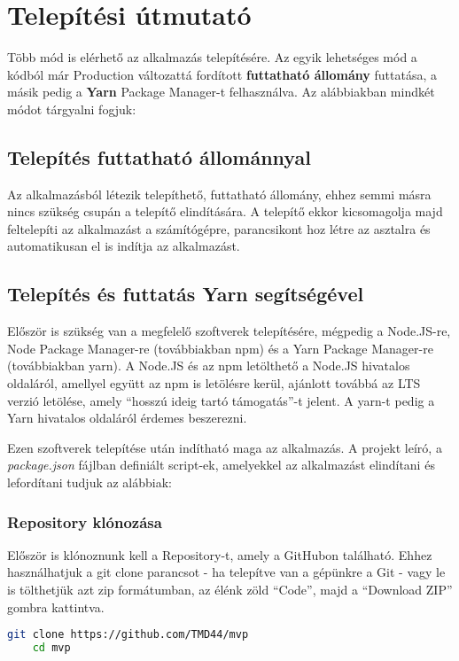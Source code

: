 \section{Telepítési útmutató}
Több mód is elérhető az alkalmazás telepítésére. Az egyik lehetséges mód a kódból már Production változattá fordított {\textbf {futtatható állomány}} futtatása, a másik pedig a {\textbf {Yarn}} Package Manager-t felhasználva. Az alábbiakban mindkét módot tárgyalni fogjuk:

\subsection{Telepítés futtatható állománnyal}
Az alkalmazásból létezik telepíthető, futtatható állomány, ehhez semmi másra nincs szükség csupán a telepítő elindítására. A telepítő ekkor kicsomagolja majd feltelepíti az alkalmazást a számítógépre, parancsikont hoz létre az asztalra és automatikusan el is indítja az alkalmazást.

\subsection{Telepítés és futtatás Yarn segítségével}
Először is szükség van a megfelelő szoftverek telepítésére, mégpedig a Node.JS-re, Node Package Manager-re (továbbiakban npm) és a Yarn Package Manager-re (továbbiakban yarn). A Node.JS és az npm letölthető a Node.JS hivatalos oldaláról\cite{node}, amellyel együtt az npm is letölésre kerül, ajánlott továbbá az LTS verzió letölése, amely ``hosszú ideig tartó támogatás''-t jelent. A yarn-t pedig a Yarn hivatalos oldaláról\cite{yarn} érdemes beszerezni.

Ezen szoftverek telepítése után indítható maga az alkalmazás. A projekt leíró, a {\it package.json} fájlban definiált script-ek, amelyekkel az alkalmazást elindítani és lefordítani tudjuk az alábbiak:

\subsubsection{Repository klónozása}
Először is klónoznunk kell a Repository-t, amely a GitHubon található. Ehhez használhatjuk a git clone parancsot - ha telepítve van a gépünkre a Git\cite{git} - vagy le is tölthetjük azt zip formátumban, az élénk zöld ``Code'', majd a ``Download ZIP'' gombra kattintva.
\begin{lstlisting}[language={Bash}, numbers={none}]
    git clone https://github.com/TMD44/mvp
    cd mvp
\end{lstlisting}

